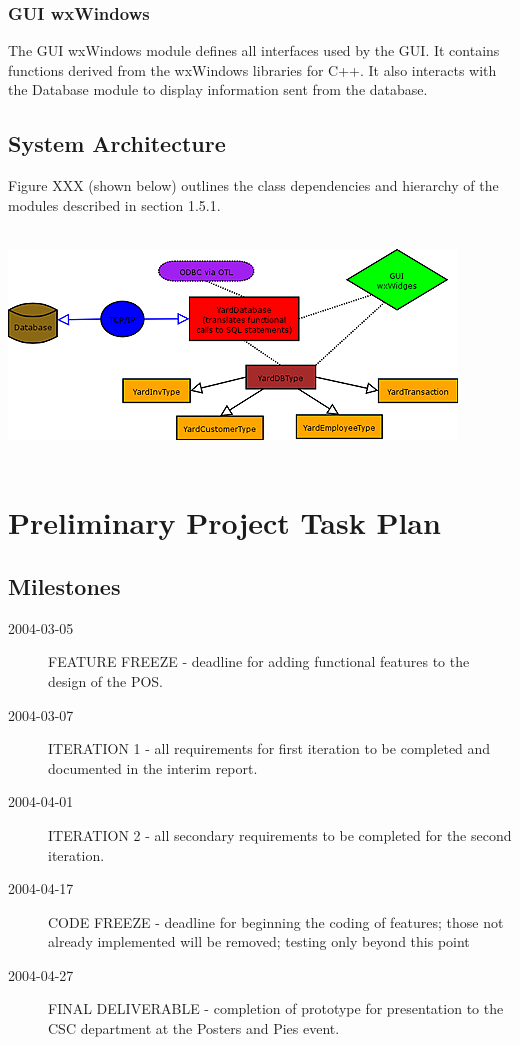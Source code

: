 \documentclass{report}
\begin{document}
        \subsubsection{GUI wxWindows}
        The GUI wxWindows module defines all interfaces used by the
        GUI.  It contains functions derived from the wxWindows
        libraries for C++.  It also interacts with the
        Database module to display information sent from the
        database.


    \subsection{System Architecture}

    Figure XXX (shown  below) outlines the class dependencies and hierarchy of
    the modules described in section 1.5.1.

    \\
    \includegraphics{yardsale_modules.png}\\
    \\


\section{Preliminary Project Task Plan}

    \subsection{Milestones}
    \begin{description}
        \item[2004-03-05] FEATURE FREEZE - deadline for adding functional
        features to the design of the POS.
        \item[2004-03-07] ITERATION 1 - all requirements for first
        iteration to be completed and documented in the interim
        report.
        \item[2004-04-01] ITERATION 2 - all secondary requirements
        to be completed for the second iteration.
        \item[2004-04-17] CODE FREEZE - deadline for beginning the
        coding of features; those not already implemented will be removed;
        testing only beyond this point
        \item[2004-04-27] FINAL DELIVERABLE - completion of
        prototype for presentation to the CSC department at the
        Posters and Pies event.
    \end{description}
\end{document}
